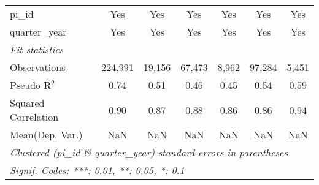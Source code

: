 \begin{tabular}{lcccccc}
   pi\_id                                                     & Yes           & Yes            & Yes           & Yes           & Yes           & Yes\\  
   quarter\_year                                              & Yes           & Yes            & Yes           & Yes           & Yes           & Yes\\  
   \midrule
   \emph{Fit statistics}\\
   Observations                                               & 224,991       & 19,156         & 67,473        & 8,962         & 97,284        & 5,451\\  
   Pseudo R$^2$                                               & 0.74          & 0.51           & 0.46          & 0.45          & 0.54          & 0.59\\  
   Squared Correlation                                        & 0.90          & 0.87           & 0.88          & 0.86          & 0.86          & 0.94\\  
Mean(Dep. Var.) & NaN & NaN & NaN & NaN & NaN & NaN \\
   \midrule \midrule
   \multicolumn{7}{l}{\emph{Clustered (pi\_id \& quarter\_year) standard-errors in parentheses}}\\
   \multicolumn{7}{l}{\emph{Signif. Codes: ***: 0.01, **: 0.05, *: 0.1}}\\
\end{tabular}
\par\endgroup

